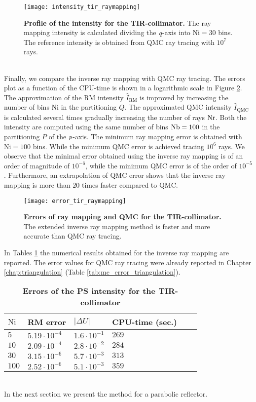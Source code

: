 \begin{figure}[t]
  \begin{center}
  \texttt{[image: intensity\_tir\_raymapping]}
  \end{center}
  \caption{\textbf{Profile of the intensity for the TIR-collimator.}
 The ray mapping intensity is calculated dividing the $\textit{q}$-axis into $\textrm{Ni}=30$ bins. The reference intensity is obtained from QMC ray tracing with $10^7$ rays.}
\label{fig:intensity_tir_raymapping}
 \end{figure}
\\ \indent 
Finally, we compare the inverse ray mapping with QMC ray tracing. The errors plot as a function of the CPU-time is shown in a logarithmic scale in Figure \ref{fig:error_tir_raymapping}. The approximation of the RM intensity $\hat{I}_{\textrm{RM}}$ is improved by increasing the number of bins $\textrm{Ni}$ in the partitioning $Q$. The approximated QMC intensity $\hat{I}_{\textrm{QMC}}$ is calculated several times gradually increasing the number of rays $\textrm{Nr}$. Both the intensity are computed using the same number of bins $\textrm{Nb}=100$ in the partitioning $P$ of the $\textit{p}$-axis. The minimum ray mapping error is obtained with $\textrm{Ni}=100$ bins. While the minimum QMC error is achieved tracing $10^6$ rays. We observe that the minimal error obtained using the inverse ray mapping is of an order of magnitude of $10^{-6}$, while the minimum QMC error is of the order of $10^{-5}$. Furthermore, an extrapolation of QMC error shows that the inverse ray mapping is more than $20$ times faster compared to QMC.
\begin{figure}[t]
  \begin{center}
  \texttt{[image: error\_tir\_raymapping]}
  \end{center}
  \caption{\textbf{Errors of ray mapping and QMC for the TIR-collimator.}
 The extended inverse ray mapping method is faster and more accurate than QMC ray tracing.}
\label{fig:error_tir_raymapping}
 \end{figure}
In Tables \ref{tab:ray_mapping_tir} the numerical results obtained for the inverse ray mapping are reported. The error values for QMC ray tracing were already reported in Chapter \ref{chap:triangulation} (Table \ref{tab:mc_error_triangulation}).
\begin{table}[t] 
\centering
\caption{\bf Errors of the PS intensity for the TIR-collimator}
\begin{tabular}{llllll}
 \hline  $\textrm{Ni}$\;  & RM error & $|\Delta U|$ & CPU-time (sec.)\\
  \hline 
 $5$    & $5.19\cdot10^{-4}$    & $1.6\cdot 10^{-1}$ & $269$  \\
$10$    & $2.09\cdot 10^{-4}$  & $2.8\cdot 10^{-2}$ & $284$   \\
$30$    & $3.15\cdot 10^{-6}$  & $5.7 \cdot 10^{-3}$ & $313$  \\
$100$  & $2.52\cdot 10^{-6}$  & $5.1 \cdot 10^{-3}$ & $359$  \\
 \hline
 \end{tabular}
 \label{tab:ray_mapping_tir}
 \end{table}
\\ \indent In the next section we present the method for a parabolic reflector.
